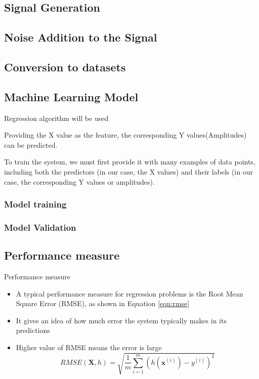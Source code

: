 \documentclass{beamer}
\begin{document}
\subsection{Signal Generation}
\subsection{Noise Addition to the Signal}
\subsection{Conversion to datasets}
\subsection{Machine Learning Model}
\begin{frame}
    Regression algorithm will be used

    Providing the X value as the feature, the corresponding Y values(Amplitudes)
    can be predicted.

    To train the system, we must first provide it with many examples of data
    points, including both the predictors (in our case, the X values) and their
    labels (in our case, the corresponding Y values or amplitudes).

    
\end{frame}
\subsubsection{Model training}
\subsubsection{Model Validation}
\subsection{Performance measure}
\begin{frame}{Performance measure}
    \begin{itemize}
        \item A typical performance measure for regression problems is the Root
        Mean Square Error (RMSE), as shown in Equation \ref{eqn:rmse}
        \item It gives an idea of how much error the system typically makes in
        its predictions
        \item Higher value of RMSE means the error is large
        \begin{equation}
            RMSE \left(\mathbf{X},h\right) = \sqrt{\frac{1}{m} \sum_{i=1}^{m}\left(h\left(\mathbf{x}^{(i)}\right) - y^{(i)}\right)^{2}}
            \label{eqn:rmse}
        \end{equation}

    \end{itemize}
    
\end{frame}
\begin{frame}
    \frametitle{}
\end{frame}
\end{document}

